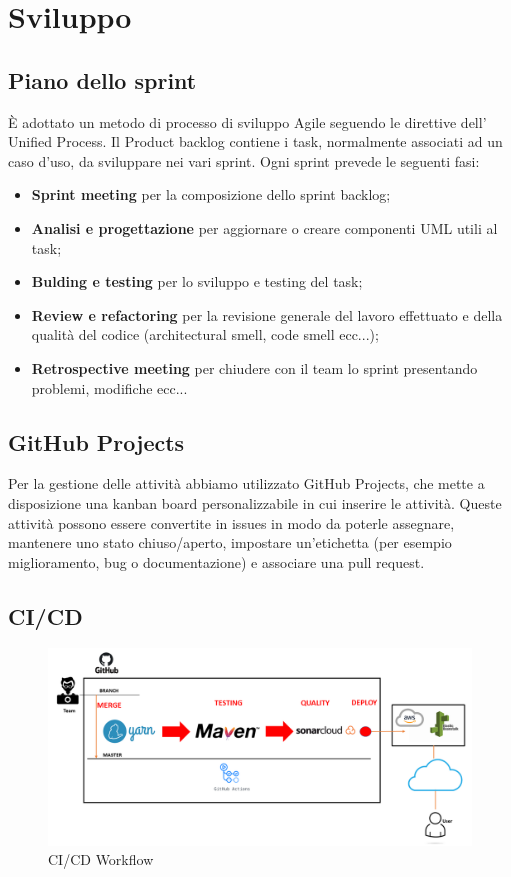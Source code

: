 \documentclass[12pt]{article}
\begin{document}
			\section{Sviluppo}
			\subsection{Piano dello sprint}
			\`{E} adottato un metodo di processo di sviluppo Agile seguendo le direttive dell' Unified Process. Il Product backlog contiene i task, normalmente associati ad un caso d'uso,  da sviluppare nei vari sprint. Ogni sprint prevede le seguenti fasi:
			\begin{itemize}
				\item {\textbf {Sprint meeting}} per la composizione dello sprint backlog;
				\item {\textbf {Analisi e progettazione}}  per aggiornare o creare componenti UML utili al task;
				\item {\textbf {Bulding e testing}}  per lo sviluppo e testing del task;
				\item {\textbf {Review e refactoring}} per la revisione generale del lavoro effettuato e della qualità del codice (architectural smell, code smell ecc...);
				\item {\textbf {Retrospective meeting}} per chiudere con il team lo sprint presentando problemi, modifiche ecc...
				
			\end{itemize}
			
			\subsection{GitHub Projects}
			Per la gestione delle attività abbiamo utilizzato GitHub Projects, che mette a disposizione una kanban board personalizzabile in cui inserire le attività. Queste attività possono essere convertite in issues in modo da poterle assegnare, mantenere uno stato chiuso/aperto, impostare un’etichetta (per esempio miglioramento, bug o documentazione) e associare una pull request.
			
			\subsection{CI/CD}
			\begin{figure}[H]
				\centering
				\includegraphics[scale=0.5]{images/Diapositiva1.PNG}
				\caption{CI/CD Workflow}
			\end{figure}
			
\end{document}
